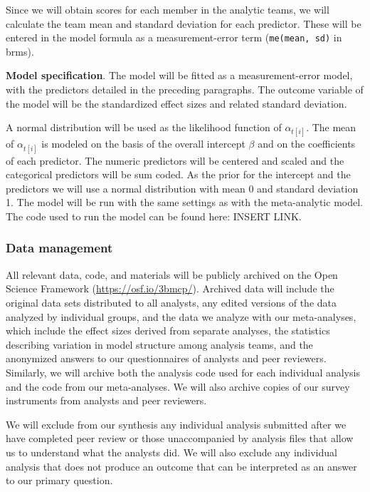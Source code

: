 \documentclass[
  12pt,
]{article}
\begin{document}
Since we will obtain scores for each member in the analytic teams, we will calculate the team mean and standard deviation for each predictor.
These will be entered in the model formula as a measurement-error term (\texttt{me(mean,\ sd)} in brms).

\textbf{Model specification}. The model will be fitted as a measurement-error model, with the predictors detailed in the preceding paragraphs.
The outcome variable of the model will be the standardized effect sizes and related standard deviation.

A normal distribution will be used as the likelihood function of \(\alpha_{t[i]}\).
The mean of \(\alpha_{t[i]}\) is modeled on the basis of the overall intercept \(\beta\) and on the coefficients of each predictor.
The numeric predictors will be centered and scaled and the categorical predictors will be sum coded.
As the prior for the intercept and the predictors we will use a normal distribution with mean 0 and standard deviation 1.
The model will be run with the same settings as with the meta-analytic model.
The code used to run the model can be found here: INSERT LINK.

\hypertarget{ana-archive}{%
\subsubsection{Data management}\label{ana-archive}}

All relevant data, code, and materials will be publicly archived on the Open Science Framework (\url{https://osf.io/3bmcp/}).
Archived data will include the original data sets distributed to all analysts, any edited versions of the data analyzed by individual groups, and the data we analyze with our meta-analyses, which include the effect sizes derived from separate analyses, the statistics describing variation in model structure among analysis teams, and the anonymized answers to our questionnaires of analysts and peer reviewers.
Similarly, we will archive both the analysis code used for each individual analysis and the code from our meta-analyses.
We will also archive copies of our survey instruments from analysts and peer reviewers.

We will exclude from our synthesis any individual analysis submitted after we have completed peer review or those unaccompanied by analysis files that allow us to understand what the analysts did.
We will also exclude any individual analysis that does not produce an outcome that can be interpreted as an answer to our primary question.
\end{document}
